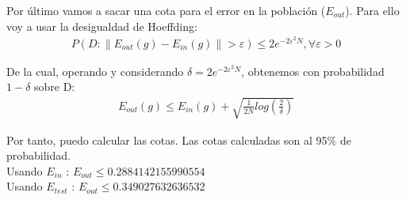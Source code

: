 \documentclass[a4paper,11pt]{article}
\begin{document}
Por último vamos a sacar una cota para el error en la población ($E_{out}$). Para ello voy a usar la desigualdad de Hoeffding:
\begin{align*}
P(D:\|E_{out}(g)-E_{in}(g)\|>\varepsilon)\leq 2e^{-2\varepsilon^2N}, \forall \varepsilon >0
\end{align*}

\newpage

De la cual, operando y considerando $\delta = 2e^{-2\varepsilon^2N}$, obtenemos con probabilidad $ 1 - \delta $ sobre D: 
\begin{align*}
E_{out}(g) \leq E_{in}(g) + \sqrt{\frac{1}{2N}log(\frac{2}{\delta})} 
\end{align*}

Por tanto, puedo calcular las cotas. Las cotas calculadas son al 95$\%$ de probabilidad.\\

Usando $E_{in}$ : $E_{out} \leq  0.2884142155990554$\\
Usando $E_{test}$ : $E_{out} \leq  0.349027632636532$
\end{document}
